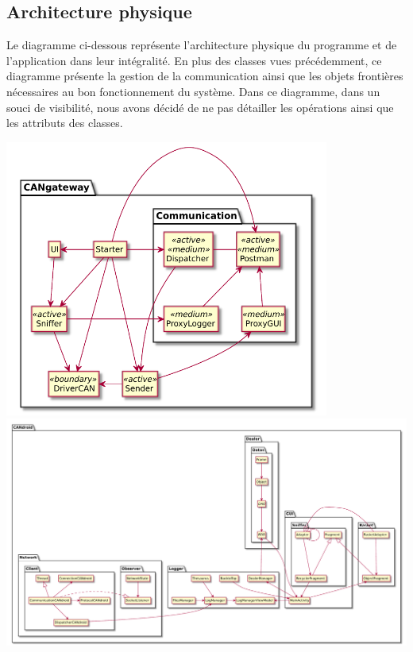 \subsection{Architecture physique}

Le diagramme ci-dessous représente l'architecture physique du programme {\nomLogiciel} et de l'application {\nomApplication} dans leur intégralité. En plus des
classes vues précédemment, ce diagramme présente la gestion de la communication ainsi que les objets frontières nécessaires au bon fonctionnement du système.
Dans ce diagramme, dans un souci de visibilité, nous avons décidé de ne pas détailler les opérations ainsi que les attributs des classes.

\begin{minipage}
    {\linewidth}
    \centering
    \includegraphics[width=0.8\textwidth]{../schemas/Conception_detaillee/architecture_CANgateway.pdf}
    \includegraphics[width=\textwidth]{../schemas/Conception_detaillee/architecture_CANdroid.pdf}
\end{minipage}